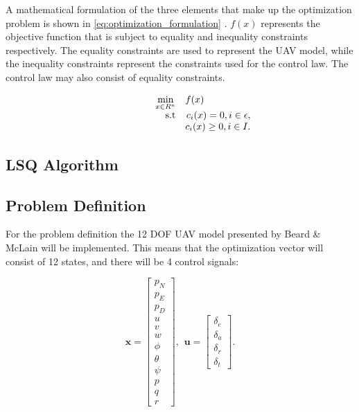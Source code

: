 A mathematical formulation of the three elements that make up the optimization problem is shown in \ref{eq:optimization_formulation} \cite{nocedalOPTIMIZATION}. $f(x)$ represents the objective function that is subject to equality and inequality constraints respectively. The equality constraints are used to represent the UAV model, while the inequality constraints represent the constraints used for the control law. The control law may also consist of equality constraints.

\begin{equation}
	\label{eq:optimization_formulation}
	\begin{array}{rrclcl}
		\displaystyle \min_{x \in R^n} & \multicolumn{3}{l}{f(x)} \\
		\textrm{s.t}
		& c_i(x) = 0, i \in \epsilon, \\
		& c_i(x) \geq 0, i \in I.
	\end{array}
\end{equation}


\subsection{LSQ Algorithm}


\subsection{Problem Definition}

For the problem definition the 12 DOF UAV model presented by Beard \& McLain \cite{uavBEARD} will be implemented. This means that the optimization vector will consist of 12 states, and there will be 4 control signals:

\begin{equation}
	\mathbf{x} =
	\begin{bmatrix}
		p_N \\ p_E \\ p_D \\
		u \\ v \\ w \\
		\phi \\ \theta \\ \psi \\
		p \\ q \\ r
	\end{bmatrix}
	, \hspace{5pt} \mathbf{u} =
	\begin{bmatrix}
		\delta_e \\ \delta_a \\ \delta_r \\ \delta_t
	\end{bmatrix}.
\end{equation}


